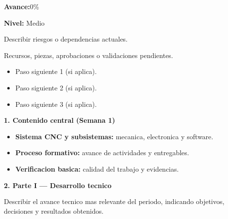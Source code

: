 \documentclass[11pt,a4paper]{article}
\newcommand{\AvancePorcentaje}{0\%}
\newcommand{\RiesgoNivel}{Medio}
\newcommand{\RiesgosDetalle}{Describir riesgos o dependencias actuales.}
\newcommand{\RecursosNecesarios}{Recursos, piezas, aprobaciones o validaciones pendientes.}
\newif\ifShowNextSteps      \ShowNextStepstrue
\newcommand{\ProximoPasoUno}{Paso siguiente 1 (si aplica).}
\newcommand{\ProximoPasoDos}{Paso siguiente 2 (si aplica).}
\newcommand{\ProximoPasoTres}{Paso siguiente 3 (si aplica).}
\newcommand{\Field}[2]{\textbf{\color{CNCdark}#1}\hspace{4pt}{\color{CNCgray}#2}}
\newcommand{\SectionTitle}[1]{%
  \vspace{1mm}
  {\Large\bfseries\color{CNCblue}#1}\par
  \vspace{1mm}
}
\newcommand{\SafeItem}{\Needspace{3\baselineskip}\item}
\begin{document}
\clearpage

\begin{tcolorbox}[title=\textbf{\color{CNCblue}Avance de hito}]
\Field{Avance:}{ }\AvancePorcentaje
\end{tcolorbox}

\begin{tcolorbox}[title=\textbf{\color{CNCblue}Riesgos y dependencias}]\textbf{Nivel:} \RiesgoNivel\par
{\color{CNCgray}\RiesgosDetalle}
\end{tcolorbox}

\begin{tcolorbox}[title=\textbf{\color{CNCblue}Recursos necesarios}]
{\color{CNCgray}\RecursosNecesarios}
\end{tcolorbox}

\ifShowNextSteps
\begin{tcolorbox}[title=\textbf{\color{CNCblue}Proximos pasos (opcional)}]
\begin{itemize}[leftmargin=*,itemsep=2pt]
  \SafeItem \ProximoPasoUno
  \SafeItem \ProximoPasoDos
  \SafeItem \ProximoPasoTres
\end{itemize}
\end{tcolorbox}
\fi

\newpage

\SectionTitle{1. Contenido central (Semana 1)}
\begin{tcolorbox}
\begin{itemize}[leftmargin=*,itemsep=3pt]
  \SafeItem \textbf{Sistema CNC y subsistemas:} mecanica, electronica y software.
  \SafeItem \textbf{Proceso formativo:} avance de actividades y entregables.
  \SafeItem \textbf{Verificacion basica:} calidad del trabajo y evidencias.
\end{itemize}
\end{tcolorbox}

\SectionTitle{2. Parte I — Desarrollo tecnico}
\begin{tcolorbox}[colback=CNCsoft2,title=\textbf{\color{CNCblue}Resumen tecnico}]
{\color{CNCgray}
Describir el avance tecnico mas relevante del periodo, indicando objetivos,
decisiones y resultados obtenidos.
}
\end{tcolorbox}
\end{document}
